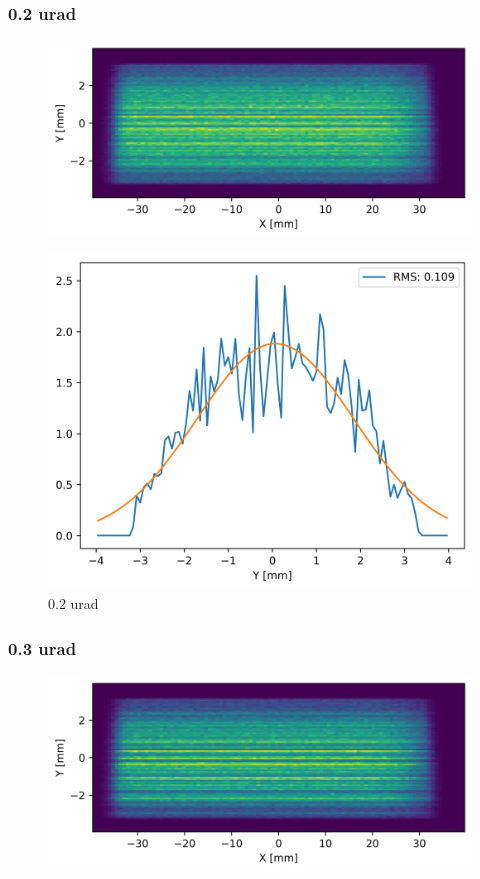 \subsubsection{0.2 urad}
\begin{figure}[H]
\centering
\includegraphics[width=0.9\linewidth]{./../figures/slope_error/WB4C_d30_d-spacing_gradient_45keV_slope_error02urad.png}
\end{figure}

\begin{figure}[H]
\centering
\includegraphics[width=0.9\linewidth]{./../figures/slope_error/WB4C_d30_d-spacing_gradient_45keV_slope_error02urad_ESRFID19PW150_Yprofile.png}
\caption{0.2 urad}
\label{fig:02urad}
\end{figure}

\clearpage
\subsubsection{0.3 urad}
\begin{figure}[H]
\centering
\includegraphics[width=0.9\linewidth]{./../figures/slope_error/WB4C_d30_d-spacing_gradient_45keV_slope_error03urad.png}
\end{figure}

